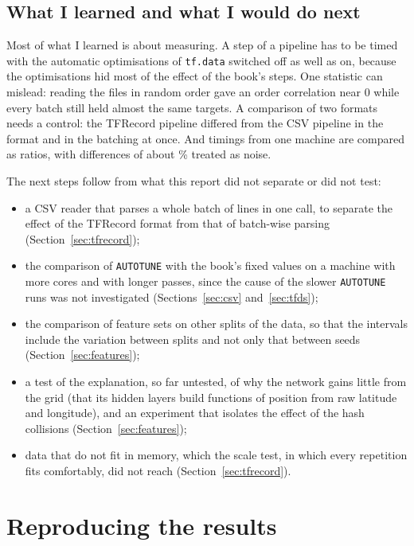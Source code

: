 \subsection{What I learned and what I would do next}

Most of what I learned is about measuring. A step of a pipeline has to be timed with the automatic optimisations of \texttt{tf.data} switched off as well as on, because the optimisations hid most of the effect of the book's steps. One statistic can mislead: reading the files in random order gave an order correlation near 0 while every batch still held almost the same targets. A comparison of two formats needs a control: the TFRecord pipeline differed from the CSV pipeline in the format and in the batching at once. And timings from one machine are compared as ratios, with differences of about \% treated as noise.

The next steps follow from what this report did not separate or did not test:
\begin{itemize}
\item a CSV reader that parses a whole batch of lines in one call, to separate the effect of the TFRecord format from that of batch-wise parsing (Section~\ref{sec:tfrecord});
\item the comparison of \texttt{AUTOTUNE} with the book's fixed values on a machine with more cores and with longer passes, since the cause of the slower \texttt{AUTOTUNE} runs was not investigated (Sections~\ref{sec:csv} and~\ref{sec:tfds});
\item the comparison of feature sets on other splits of the data, so that the intervals include the variation between splits and not only that between seeds (Section~\ref{sec:features});
\item a test of the explanation, so far untested, of why the network gains little from the grid (that its hidden layers build functions of position from raw latitude and longitude), and an experiment that isolates the effect of the hash collisions (Section~\ref{sec:features});
\item data that do not fit in memory, which the scale test, in which every repetition fits comfortably, did not reach (Section~\ref{sec:tfrecord}).
\end{itemize}

\section{Reproducing the results}
\label{sec:repro}


